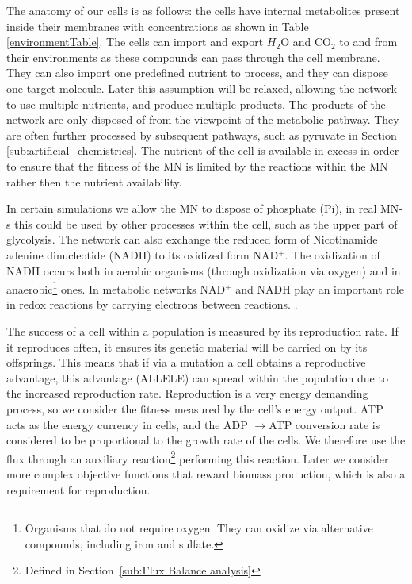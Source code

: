 \documentclass[a4paper,12pt]{article}
\begin{document}
	The anatomy of our cells is as follows: the cells have internal metabolites present inside  their membranes with concentrations as shown in Table \ref{environmentTable}. The cells can import and export $H_2$O and CO$_2$ to and from their environments as these compounds can pass through the cell membrane. They can also import one predefined nutrient to process, and they can dispose one target molecule. Later this assumption will be relaxed, allowing the network to use multiple nutrients, and produce multiple products. The products of the network are only disposed of from the viewpoint of the metabolic pathway. They are often further processed by subsequent pathways, such as pyruvate in Section \ref{sub:artificial_chemistries}. The nutrient of the cell is available in excess in order to ensure that the fitness of the MN is limited by the reactions within the MN rather then the nutrient availability. 
	
	In certain simulations we allow the MN to dispose of phosphate (Pi), in real MN-s this could be used by other processes within the cell, such as the upper part of glycolysis. The network can also exchange the reduced form of Nicotinamide adenine dinucleotide (NADH) to its oxidized form NAD$^+$. The oxidization of NADH occurs both in aerobic organisms (through oxidization via oxygen) and in anaerobic\footnote{ Organisms that do not require oxygen. They can oxidize via alternative compounds, including iron and sulfate.} ones. In metabolic networks NAD$^+$ and NADH play an important role in redox reactions by carrying electrons between reactions. \cite{principlesofbio}.

	The success of a cell within a population is measured by its reproduction rate. If it reproduces often, it ensures its genetic material will be carried on by its offsprings. This means that if via a mutation a cell obtains a reproductive advantage, this advantage (ALLELE)  can spread within the population due to the increased reproduction rate. Reproduction is a very energy demanding process, so we consider the fitness  measured by the cell's energy output. ATP acts as the energy currency in cells, and the ADP $\rightarrow$ATP conversion rate is considered to be proportional to the growth rate of the cells. We therefore use the flux through an auxiliary reaction\footnote{Defined in Section~\ref{sub:Flux Balance analysis}} performing this reaction.  Later we consider more complex objective functions that reward biomass production, which is also a requirement for reproduction. 
\end{document}
